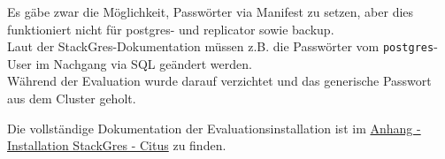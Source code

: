 \begin{flushleft}
    Es gäbe zwar die Möglichkeit, Passwörter via Manifest zu setzen, aber dies funktioniert nicht für postgres- und replicator sowie backup.\\
    Laut der StackGres-Dokumentation müssen z.B. die Passwörter vom \texttt{postgres}-User im Nachgang via SQL geändert werden.\\
    Während der Evaluation wurde darauf verzichtet und das generische Passwort aus dem Cluster geholt.
\end{flushleft}
\begin{flushleft}
    Die vollständige Dokumentation der Evaluationsinstallation ist im \hyperref[subsec:evaluation_installation_stackgres]{Anhang - Installation StackGres - Citus} zu finden.
\end{flushleft}